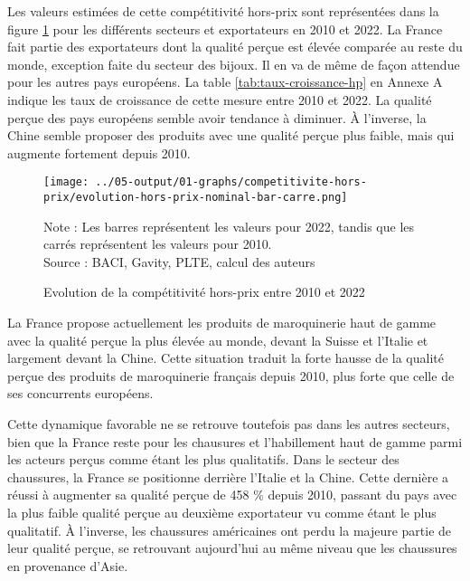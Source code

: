 \documentclass[french,10pt,a4paper]{article}
\begin{document}
Les valeurs estimées de cette compétitivité hors-prix sont représentées dans la figure \ref{fig:hors-prix} pour les différents secteurs et exportateurs en 2010 et 2022. La France fait partie des exportateurs dont la qualité perçue est élevée comparée au reste du monde, exception faite du secteur des bijoux. Il en va de même de façon attendue pour les autres pays européens. La table \ref{tab:taux-croissance-hp} en Annexe A indique les taux de croissance de cette mesure entre 2010 et 2022. La qualité perçue des pays européens semble avoir tendance à diminuer. À l'inverse, la Chine semble proposer des produits avec une qualité perçue plus faible, mais qui augmente fortement depuis 2010.

\begin{figure}[!h]
  \centering
  \texttt{[image: ../05-output/01-graphs/competitivite-hors-prix/evolution-hors-prix-nominal-bar-carre.png]}
  \captionsetup{justification=justified, singlelinecheck=false, font=small}
  \caption*{Note : Les barres représentent les valeurs pour 2022, tandis que les carrés représentent les valeurs pour 2010. \\
  Source : BACI, Gavity, PLTE, calcul des auteurs}
  \captionsetup{justification=centering, singlelinecheck=true, font=normalsize}
  \caption{Evolution de la compétitivité hors-prix entre 2010 et 2022}
  \label{fig:hors-prix}
\end{figure}

\bigskip

La France propose actuellement les produits de maroquinerie haut de gamme avec la qualité perçue la plus élevée au monde, devant la Suisse et l'Italie et largement devant la Chine. Cette situation traduit la forte hausse de la qualité perçue des produits de maroquinerie français depuis 2010, plus forte que celle de ses concurrents européens.

Cette dynamique favorable ne se retrouve toutefois pas dans les autres secteurs, bien que la France reste pour les chausures et l'habillement haut de gamme parmi les acteurs perçus comme étant les plus qualitatifs. Dans le secteur des chaussures, la France se positionne derrière l'Italie et la Chine. Cette dernière a réussi à augmenter sa qualité perçue de 458 \% depuis 2010, passant du pays avec la plus faible qualité perçue au deuxième exportateur vu comme étant le plus qualitatif. À l'inverse, les chaussures américaines ont perdu la majeure partie de leur qualité perçue, se retrouvant aujourd'hui au même niveau que les chaussures en provenance d'Asie.
\end{document}
